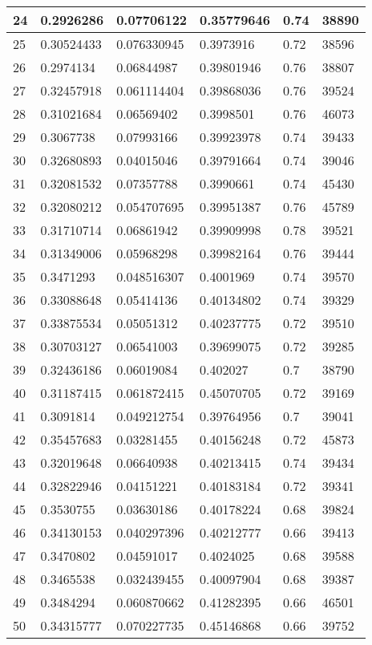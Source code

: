 \begin{longtable}{|l|l|l|l|l|l|}
24 & 0.2926286 & 0.07706122 & 0.35779646 & 0.74 & 38890 \\ \hline 
25 & 0.30524433 & 0.076330945 & 0.3973916 & 0.72 & 38596 \\ \hline 
26 & 0.2974134 & 0.06844987 & 0.39801946 & 0.76 & 38807 \\ \hline 
27 & 0.32457918 & 0.061114404 & 0.39868036 & 0.76 & 39524 \\ \hline 
28 & 0.31021684 & 0.06569402 & 0.3998501 & 0.76 & 46073 \\ \hline 
29 & 0.3067738 & 0.07993166 & 0.39923978 & 0.74 & 39433 \\ \hline 
30 & 0.32680893 & 0.04015046 & 0.39791664 & 0.74 & 39046 \\ \hline 
31 & 0.32081532 & 0.07357788 & 0.3990661 & 0.74 & 45430 \\ \hline 
32 & 0.32080212 & 0.054707695 & 0.39951387 & 0.76 & 45789 \\ \hline 
33 & 0.31710714 & 0.06861942 & 0.39909998 & 0.78 & 39521 \\ \hline 
34 & 0.31349006 & 0.05968298 & 0.39982164 & 0.76 & 39444 \\ \hline 
35 & 0.3471293 & 0.048516307 & 0.4001969 & 0.74 & 39570 \\ \hline 
36 & 0.33088648 & 0.05414136 & 0.40134802 & 0.74 & 39329 \\ \hline 
37 & 0.33875534 & 0.05051312 & 0.40237775 & 0.72 & 39510 \\ \hline 
38 & 0.30703127 & 0.06541003 & 0.39699075 & 0.72 & 39285 \\ \hline 
39 & 0.32436186 & 0.06019084 & 0.402027 & 0.7 & 38790 \\ \hline 
40 & 0.31187415 & 0.061872415 & 0.45070705 & 0.72 & 39169 \\ \hline 
41 & 0.3091814 & 0.049212754 & 0.39764956 & 0.7 & 39041 \\ \hline 
42 & 0.35457683 & 0.03281455 & 0.40156248 & 0.72 & 45873 \\ \hline 
43 & 0.32019648 & 0.06640938 & 0.40213415 & 0.74 & 39434 \\ \hline 
44 & 0.32822946 & 0.04151221 & 0.40183184 & 0.72 & 39341 \\ \hline 
45 & 0.3530755 & 0.03630186 & 0.40178224 & 0.68 & 39824 \\ \hline 
46 & 0.34130153 & 0.040297396 & 0.40212777 & 0.66 & 39413 \\ \hline 
47 & 0.3470802 & 0.04591017 & 0.4024025 & 0.68 & 39588 \\ \hline 
48 & 0.3465538 & 0.032439455 & 0.40097904 & 0.68 & 39387 \\ \hline 
49 & 0.3484294 & 0.060870662 & 0.41282395 & 0.66 & 46501 \\ \hline 
50 & 0.34315777 & 0.070227735 & 0.45146868 & 0.66 & 39752 \\ \hline 
\end{longtable}